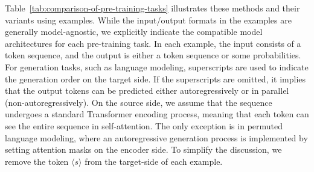 Table~\ref{tab:comparison-of-pre-training-tasks} illustrates these methods and their variants using examples. While the input/output formats in the examples are generally model-agnostic, we explicitly indicate the compatible model architectures for each pre-training task. In each example, the input consists of a token sequence, and the output is either a token sequence or some probabilities. For generation tasks, such as language modeling, superscripts are used to indicate the generation order on the target side. If the superscripts are omitted, it implies that the output tokens can be predicted either autoregressively or in parallel (non-autoregressively). On the source side, we assume that the sequence undergoes a standard Transformer encoding process, meaning that each token can see the entire sequence in self-attention. The only exception is in permuted language modeling, where an autoregressive generation process is implemented by setting attention masks on the encoder side. To simplify the discussion, we remove the token $\langle s \rangle$ from the target-side of each example.

